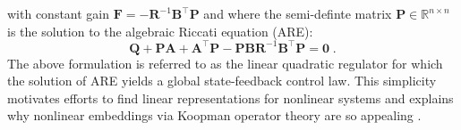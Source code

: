 with constant gain $\mathbf{F} = \mathbf{-R}^{-1}\mathbf{B}^\top\mathbf{P}$ and where the semi-definte matrix $\mathbf{P} \in \mathbb{R}^{n \times n}$ is the solution to the algebraic Riccati equation (ARE):
\begin{equation}
    \mathbf{Q} + \mathbf{PA} +\mathbf{A}^\top\mathbf{P} - \mathbf{PBR}^{-1}\mathbf{B}^\top\mathbf{P} = \mathbf{0}\;.
\end{equation}
The above formulation is referred to as the linear quadratic regulator for which the solution of ARE yields a global state-feedback control law. This simplicity motivates efforts to find linear representations for nonlinear systems and explains why nonlinear embeddings via Koopman operator theory are so appealing \cite{kaiser2020datadriven}. 
\pagebreak